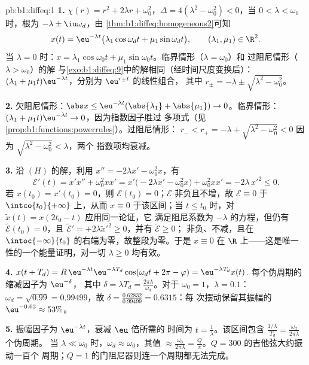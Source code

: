 \begin{solution}{pb:b1:diffeq:1}
\textbf{1.} $\chi(r) = r^2 + 2\lambda r + \omega_0^2$，$\Delta =
4(\lambda^2 - \omega_0^2) < 0$，当 $0 < \lambda < \omega_0$ 时，根为
$-\lambda \pm \iu\omega_d$，由
\cref{thm:b1:diffeq:homogeneous2}可知
\[
x(t) = \eu^{-\lambda t}\bigl(\lambda_1\cos\omega_d t +
\mu_1\sin\omega_d t\bigr), \qquad (\lambda_1, \mu_1) \in \R^2 .
\]
当 $\lambda = 0$ 时：$x = \lambda_1\cos\omega_0 t +
\mu_1\sin\omega_0 t$。临界情形（$\lambda = \omega_0$）和
过阻尼情形（$\lambda > \omega_0$）的解
与\cref{exo:b1:diffeq:9}中的解相同（经时间尺度变换后）：$(\lambda_1 +
\mu_1 t)\eu^{-\lambda t}$，分别为 $\eu^{r_\pm t}$ 的线性组合，
其中 $r_\pm = -\lambda \pm \sqrt{\lambda^2 - \omega_0^2}$。

\textbf{2.} 欠阻尼情形：$\abs x \leq \eu^{-\lambda
t}(\abs{\lambda_1} + \abs{\mu_1}) \to 0$。临界情形：$(\lambda_1 +
\mu_1 t)\eu^{-\lambda t} \to 0$，因为指数因子胜过
多项式（见\cref{prop:b1:functions:powerrules}）。过阻尼情形：
$r_- < r_+ = -\lambda + \sqrt{\lambda^2 - \omega_0^2} < 0$
因为 $\sqrt{\lambda^2 - \omega_0^2} < \lambda$，两个
指数项均衰减。

\textbf{3.} 沿 $(H)$ 的解，利用 $x'' = -2\lambda x' -
\omega_0^2 x$，有
\[
\mathcal E'(t) = x'x'' + \omega_0^2 x x'
= x'\bigl(-2\lambda x' - \omega_0^2 x\bigr) + \omega_0^2 xx'
= -2\lambda\,x'^2 \leq 0 .
\]
若 $x(t_0) = x'(t_0) = 0$，则 $\mathcal E(t_0) = 0$；$\mathcal E$
非负且不增，故 $\mathcal E \equiv 0$ 于
$\intco{t_0}{+\infty}$ 上，从而 $x \equiv 0$ 于该区间；当 $t \leq
t_0$ 时，对 $\tilde x(t) = x(2t_0 - t)$ 应用同一论证，它
满足阻尼系数为 $-\lambda$ 的方程，但仍有
$\tilde{\mathcal E}(t_0) = 0$，且 $\tilde{\mathcal E}' =
+2\lambda\tilde x'^2 \geq 0$，并有 $\tilde{\mathcal E} \geq 0$；
非负、不减，且在
$\intoc{-\infty}{t_0}$ 的右端为零，故整段为零。于是 $x \equiv 0$ 在
$\R$ 上——这是唯一性的一个能量证明，对一切 $\lambda
\geq 0$ 均有效。

\textbf{4.} $x(t + T_d) = R\,\eu^{-\lambda t}\eu^{-\lambda
T_d}\cos(\omega_d t + 2\pi - \varphi) = \eu^{-\lambda T_d}x(t)$.
每个伪周期的缩减因子为 $\eu^{-\delta}$，
其中 $\delta = \lambda T_d = \frac{2\pi\lambda}{\omega_d}$。对于
$\omega_0 = 1$，$\lambda = 0.1$：$\omega_d = \sqrt{0.99} =
0.99499$，故 $\delta = \frac{0.62832}{0.99499} = 0.6315$：每
次摆动保留其振幅的 $\eu^{-0.63} \approx 53\%$。

\textbf{5.} 振幅因子为 $\eu^{-\lambda t}$，衰减 $\eu$ 倍所需的
时间为 $t = \frac1\lambda$。该区间包含
$\frac{1/\lambda}{T_d} = \frac{\omega_d}{2\pi\lambda}$ 个伪周期。
当 $\lambda \ll \omega_0$ 时，$\omega_d \approx
\omega_0$，其值 $\approx \frac{\omega_0}{2\pi\lambda} =
\frac Q\pi$。$Q = 300$ 的吉他弦大约振动一百个
周期；$Q = 1$ 的门阻尼器则连一个周期都无法完成。


\end{solution}

